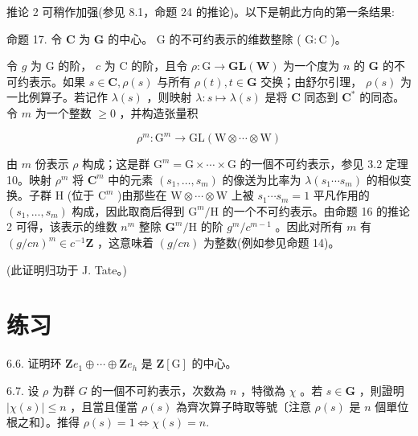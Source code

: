 \documentclass[10pt]{article}
\begin{document}
推论 2 可稍作加强(参见 8.1，命题 24 的推论)。以下是朝此方向的第一条结果:

命题 17. 令 \(\mathbf{C}\) 为 \(\mathbf{G}\) 的中心。 \(\mathrm{G}\) 的不可约表示的维数整除 ( \(\mathrm{G} : \mathrm{C}\) )。

令 \(g\) 为 \(\mathrm{G}\) 的阶， \(c\) 为 \(\mathrm{C}\) 的阶，且令 \(\rho  : \mathrm{G} \rightarrow  \mathbf{{GL}}\left( \mathbf{W}\right)\) 为一个度为 \(n\) 的 \(\mathbf{G}\) 的不可约表示。如果 \(s \in  \mathbf{C},\rho \left( s\right)\) 与所有 \(\rho \left( t\right) ,t \in  \mathbf{G}\) 交换；由舒尔引理， \(\rho \left( s\right)\) 为一比例算子。若记作 \(\lambda \left( s\right)\) ，则映射 \(\lambda  : s \mapsto  \lambda \left( s\right)\) 是将 \(\mathbf{C}\) 同态到 \({\mathbf{C}}^{ * }\) 的同态。令 \(m\) 为一个整数 \(\geq  0\) ，并构造张量积

\[
{\rho }^{m} : {\mathrm{G}}^{m} \rightarrow  \mathrm{{GL}}\left( {\mathrm{W} \otimes  \cdots  \otimes  \mathrm{W}}\right)
\]

由 \(m\) 份表示 \(\rho\) 构成；这是群 \({\mathrm{G}}^{m} = \mathrm{G} \times  \cdots  \times  \mathrm{G}\) 的一個不可约表示，参见 3.2 定理 10。映射 \({\rho }^{m}\) 将 \({\mathbf{C}}^{m}\) 中的元素 \(\left( {{s}_{1},\ldots ,{s}_{m}}\right)\) 的像送为比率为 \(\lambda \left( {{s}_{1}\cdots {s}_{m}}\right)\) 的相似变换。子群 \(\mathrm{H}\) (位于 \({\mathrm{C}}^{m}\) )由那些在 \(\mathrm{W} \otimes  \cdots  \otimes  \mathrm{W}\) 上被 \({s}_{1}\cdots {s}_{m} = 1\) 平凡作用的 \(\left( {{s}_{1},\ldots ,{s}_{m}}\right)\) 构成，因此取商后得到 \({\mathrm{G}}^{m}/\mathrm{H}\) 的一个不可约表示。由命题 16 的推论 2 可得，该表示的维数 \({n}^{m}\) 整除 \({\mathbf{G}}^{m}/\mathrm{H}\) 的阶 \({g}^{m}/{c}^{m - 1}\) 。因此对所有 \(m\) 有 \({\left( g/cn\right) }^{m} \in  {c}^{-1}\mathbf{Z}\) ，这意味着 \(\left( {g/{cn}}\right)\) 为整数(例如参见命题 14)。

(此证明归功于 J. Tate。)

\section*{练习}

6.6. 证明环 \(\mathbf{Z}{e}_{1} \oplus  \cdots  \oplus  \mathbf{Z}{e}_{h}\) 是 \(\mathbf{Z}\left\lbrack  \mathrm{G}\right\rbrack\) 的中心。

6.7. 设 \(\rho\) 为群 \(G\) 的一個不可約表示，次数為 \(n\) ，特徵為 \(\chi\) 。若 \(s \in  \mathbf{G}\) ，則證明 \(\left| {\chi \left( s\right) }\right|  \leq  n\) ，且當且僅當 \(\rho \left( s\right)\) 為齊次算子時取等號〔注意 \(\rho \left( s\right)\) 是 \(n\) 個單位根之和〕。推得 \(\rho \left( s\right)  = 1 \Leftrightarrow  \chi \left( s\right)  = n.\)
\end{document}
